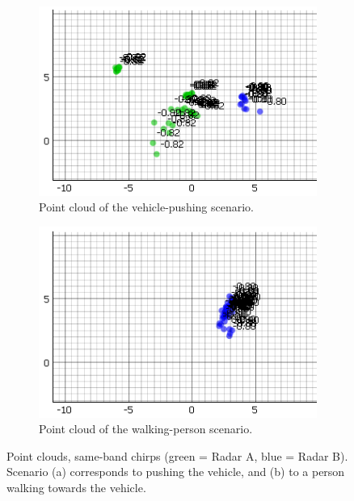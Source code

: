 \begin{figure}[!htbp]
    \centering
    \begin{subfigure}{0.48\linewidth}
        \includegraphics[width=\linewidth]{images/DualSensorSameConfigPointCloud.png}
        \caption{Point cloud of the vehicle-pushing scenario.}
        \label{fig:dual_samechirp_pointcloud}
    \end{subfigure}
    \hfill
    \begin{subfigure}{0.48\linewidth}
        \includegraphics[width=\linewidth]{images/DualSensorSameConfigPointCloudPerson.png}
        \caption{Point cloud of the walking-person scenario.}
        \label{fig:dual_samechirp_cluster}
    \end{subfigure}
    \caption{Point clouds, same-band chirps (green = Radar A, blue = Radar B).  
    Scenario (a) corresponds to pushing the vehicle, and (b) to a person walking towards the vehicle.}
    \label{fig:dual_samechirp_results}
\end{figure}

